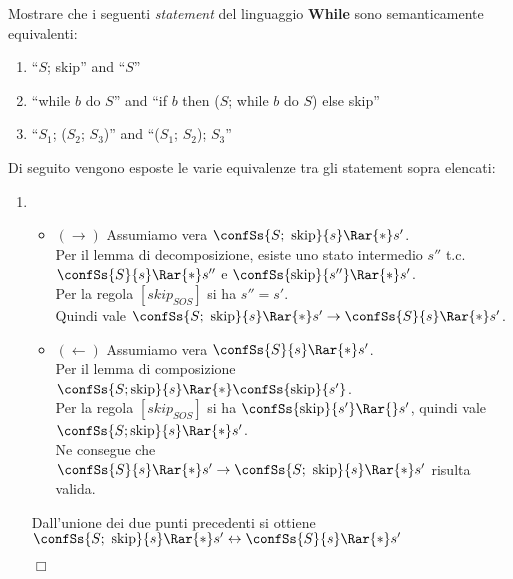 {
  Mostrare che i seguenti \textit{statement} del linguaggio \textbf{While} sono
  semanticamente equivalenti:
  \begin{enumerate}[label=\alph*)]
    \item ``$S$; skip'' and ``$S$''
    \item ``while $b$ do $S$'' and
      ``if $b$ then ($S$; while $b$ do $S$) else skip''
    \item ``$S_1$; ($S_2$; $S_3$)'' and ``($S_1$; $S_2$); $S_3$''
  \end{enumerate}
}
{
  Di seguito vengono esposte le varie equivalenze tra gli statement sopra
  elencati:

  \begin{enumerate}[label=\alph*)]
    \item {}
    \begin{itemize}
      \item $(\rightarrow)$ Assumiamo vera
      $\confSs{S;\mbox{ skip}}{s} \Rar{*} s'$. \\
      Per il lemma di decomposizione, esiste uno stato intermedio $s''$ t.c.
      $\confSs{S}{s} \Rar{*} s''$ e $\confSs{\mbox{skip}}{s''} \Rar{*} s'$. \\
      Per la regola $[skip_{SOS}]$ si ha $s'' = s'$. \\
      Quindi vale $\confSs{S;\mbox{ skip}}{s} \Rar{*} s' \rightarrow \confSs{S}{s} 
      \Rar{*} s'$.

      \item $(\leftarrow)$ Assumiamo vera $\confSs{S}{s} \Rar{*} s'$. \\
      Per il lemma di composizione $\confSs{S; \mbox{skip}}{s} \Rar{*} 
      \confSs{\mbox{skip}}{s'}$. \\
      Per la regola $[skip_{SOS}]$ si ha $\confSs{\mbox{skip}}{s'} \Rar{} s'$,
      quindi vale $\confSs{S; \mbox{skip}}{s} \Rar{*} s'$. \\ 
      Ne consegue che 
      $ \confSs{S}{s} \Rar{*} s' \rightarrow 
         \confSs{S;\mbox{ skip}}{s} \Rar{*} s'$ risulta valida.     
    \end{itemize}
      Dall'unione dei due punti precedenti si ottiene 
      $\confSs{S;\mbox{ skip}}{s} \Rar{*} s' \leftrightarrow 
      \confSs{S}{s} \Rar{*} s'$
      \begin{flushright}
      $\Box$
      \end{flushright}


\end{enumerate}}
